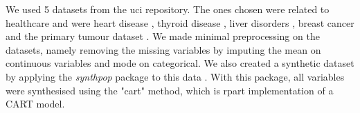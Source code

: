 
We used 5 datasets from the \ac{uci} repository. The ones chosen were related to healthcare and were heart disease \cite{misc_heart_disease_45}, thyroid disease \cite{misc_thyroid_disease_102}, liver disorders \cite{misc_liver_disorders_60}, breast cancer \cite{misc_breast_cancer_wisconsin_diagnostic_17} and the primary tumour dataset \cite{misc_primary_tumor_83}. We made minimal preprocessing on the datasets, namely removing the missing variables by imputing the mean on continuous variables and mode on categorical.
We also created a synthetic dataset by applying the \textit{synthpop} package to this data \cite{synthpop}. With this package, all variables were synthesised using the "cart" method, which is rpart implementation of a CART model.

